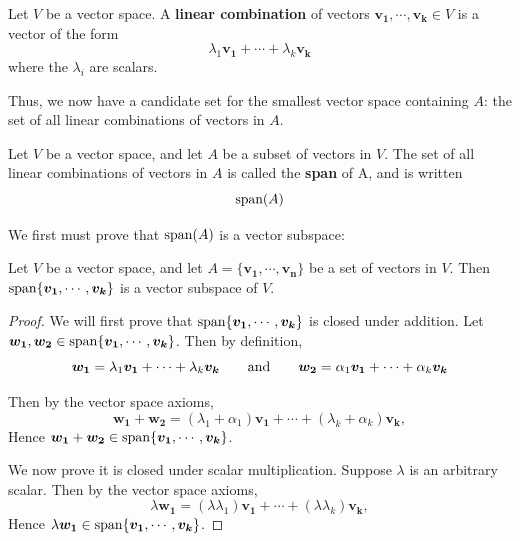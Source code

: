     \begin{definition}
    Let $V$ be a vector space.  A \textbf{linear combination} of vectors $\bm{v_1}, \cdots, \bm{v_k} \in V$ is a vector of the form 
    $$\lambda_1\bm{v_1} + \cdots + \lambda_k\bm{v_k}$$ where the $\lambda_i$ are scalars.
    \end{definition}
    
    Thus, we now have a candidate set for the smallest vector space containing $A$:  the set of all linear combinations of vectors in $A$.
    
    \begin{definition}
    Let $V$ be a vector space, and let $A$ be a subset of vectors in $V$.  The set of all linear combinations of vectors in $A$ is called the \textbf{span} of A, and is written
    $$\textnormal{span}(A)$$
     
\end{definition}
    
    We first must prove that $\textnormal{span}(A)$ is a vector subspace:
    
    \begin{theorem}
    Let $V$ be a vector space, and let $A = \{\bm{v_1}, \cdots, \bm{v_n}\}$ be a set of vectors in $V$.  Then $\textnormal{span}\{\bm{v_1}, \cdots, \bm{v_k}\}$ is a vector subspace of $V$.
    \end{theorem}
    
    \begin{proof}
    We will first prove that $\textnormal{span}\{\bm{v_1}, \cdots, \bm{v_k}\}$ is closed under addition.  Let $\bm{w_1}, \bm{w_2} \in \textnormal{span}\{\bm{v_1}, \cdots, \bm{v_k}\}$.  Then by definition, $$\bm{w_1} = \lambda_1\bm{v_1} + \cdots + \lambda_k\bm{v_k} \qquad \textnormal{and} \qquad \bm{w_2} = \alpha_1\bm{v_1} + \cdots + \alpha_k\bm{v_k}$$
    
    Then by the vector space axioms, $$\bm{w_1} + \bm{w_2} = (\lambda_1+\alpha_1)\bm{v_1} + \cdots + (\lambda_k+\alpha_k)\bm{v_k},$$ Hence $\bm{w_1} + \bm{w_2} \in \textnormal{span}\{\bm{v_1}, \cdots, \bm{v_k}\}$.
    
    We now prove it is closed under scalar multiplication.  Suppose $\lambda$ is an arbitrary scalar.  Then by the vector space axioms, $$\lambda \bm{w_1} = (\lambda\lambda_1)\bm{v_1} + \cdots + (\lambda\lambda_k)\bm{v_k},$$ Hence  $\lambda\bm{w_1} \in \textnormal{span}\{\bm{v_1}, \cdots, \bm{v_k}\}$.
    \end{proof}
    
